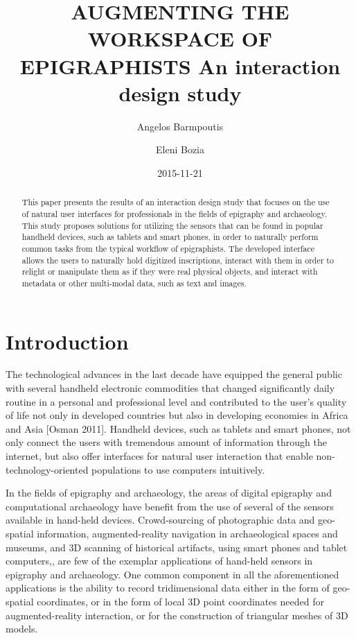 \documentclass[amsthm,ebook]{saparticle}
\title{AUGMENTING THE WORKSPACE OF EPIGRAPHISTS
An interaction design study}
\author[1]{Angelos Barmpoutis\corref{first}}
\author[2]{Eleni Bozia}
\date{2015-11-21}
\begin{document}
\maketitle
\begin{abstract}
This paper presents the results of an interaction design study that focuses on the use of natural user
interfaces for professionals in the fields of epigraphy and archaeology. This study proposes solutions for utilizing
the sensors that can be found in popular handheld devices, such as tablets and smart phones, in order to naturally
perform common tasks from the typical workflow of epigraphists. The developed interface allows the users to naturally
hold digitized inscriptions, interact with them in order to relight or manipulate them as if they were real physical
objects, and interact with metadata or other multi-modal data, such as text and images. 
\end{abstract}

\section{Introduction}


\noindent The technological advances in the last decade have equipped the general public with several handheld electronic
commodities that changed significantly daily routine in a personal and professional level and contributed to the user's
quality of life not only in developed countries but also in developing economies in Africa and Asia [Osman 2011].
Handheld devices, such as tablets and smart phones, not only connect the users with tremendous amount of information
through the internet, but also offer interfaces for natural user interaction that enable non-technology-oriented
populations to use computers intuitively.

In the fields of epigraphy and archaeology, the areas of digital epigraphy and computational archaeology have benefit
from the use of several of the sensors available in hand-held devices. Crowd-sourcing of photographic data and
geo-spatial information, augmented-reality navigation in archaeological spaces and museums, and 3D scanning of
historical artifacts, using smart phones and tablet computers,, are few of the exemplar applications of hand-held
sensors in epigraphy and archaeology. One common component in all the aforementioned applications is the ability to
record tridimensional data either in the form of geo-spatial coordinates, or in the form of local 3D point coordinates
needed for augmented-reality interaction, or for the construction of triangular meshes of 3D models. 
\end{document}
